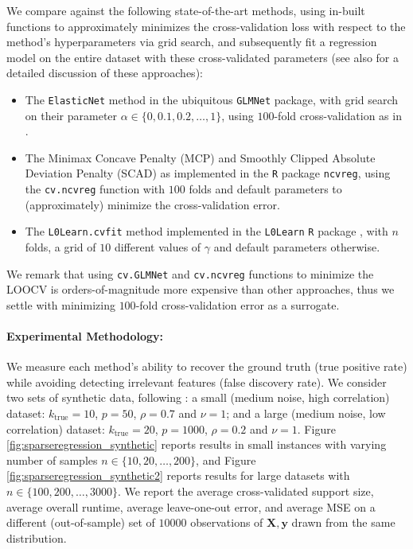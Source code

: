 \documentclass[opre,nonblindrev]{informs3} %
\begin{document}
We compare against the following state-of-the-art methods, using in-built functions to approximately minimizes the cross-validation loss with respect to the method's hyperparameters via grid search, and subsequently fit a regression model on the entire dataset with these cross-validated parameters (see also \cite{bertsimas2020sparse2} for a detailed discussion of these approaches):
\begin{itemize}
    \item The \verb|ElasticNet| method in the ubiquitous \verb|GLMNet| package, with grid search on their parameter $\alpha \in \{0, 0.1, 0.2, \ldots, 1\}$, using $100$-fold cross-validation as in \citep{bertsimas2020sparse2}. 
    \item The Minimax Concave Penalty (MCP) and Smoothly Clipped Absolute Deviation Penalty (SCAD) as implemented in the \verb|R| package \verb|ncvreg|, using the \verb|cv.ncvreg| function with $100$ folds and default parameters to (approximately) minimize the cross-validation error.
    \item The \verb|L0Learn.cvfit| method implemented in the \verb|L0Learn| \verb|R| package \citep[c.f.][]{hazimeh2020fast}, with $n$ folds, a grid of $10$ different values of $\gamma$ and default parameters otherwise. 
\end{itemize}

We remark that using  \verb|cv.GLMNet| and \verb|cv.ncvreg| functions to minimize the LOOCV is orders-of-magnitude more expensive than other approaches, thus we settle with minimizing $100$-fold cross-validation error as a surrogate. 


\paragraph{Experimental Methodology: } We measure each method's ability to recover the ground truth (true positive rate) while avoiding detecting irrelevant features (false discovery rate). We consider two sets of synthetic data, following \cite{bertsimas2020sparse2}: a small (medium noise, high correlation) dataset: $k_{\text{true}}=10$, $p=50$, $\rho=0.7$ and $\nu=1$; and a large (medium noise, low correlation) dataset: $k_{\text{true}}=20$, $p=1000$, $\rho=0.2$ and $\nu=1$. Figure \ref{fig:sparseregression_synthetic} reports results in small instances with varying number of samples $n \in \{10, 20, \ldots, 200\}$, and Figure \ref{fig:sparseregression_synthetic2} reports results for large datasets with  $n \in \{100, 200, \ldots, 3000\}$. We report the average cross-validated support size, average overall runtime, average leave-one-out error, and average MSE on a different (out-of-sample) set of $10000$ observations of $\bm{X}, \bm{y}$ drawn from the same distribution. 
\end{document}
